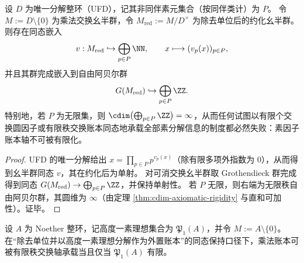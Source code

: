 \begin{theorem}\label{thm:prime-ledger-non-finitizable-ufd}
设 \(D\) 为唯一分解整环（UFD），记其非同伴素元集合（按同伴类计）为 \(P\)。
令 \(M:=D\setminus\{0\}\) 为乘法交换幺半群，令 \(M_{\mathrm{red}}:=M/D^\times\) 为除去单位后的约化幺半群。
则存在同态嵌入
\[
v:M_{\mathrm{red}}\hookrightarrow \bigoplus_{p\in P}\NN,\qquad x\longmapsto (v_p(x))_{p\in P},
\]
并且其群完成嵌入到自由阿贝尔群
\[
G(M_{\mathrm{red}})\hookrightarrow \bigoplus_{p\in P}\ZZ.
\]
特别地，若 \(P\) 为无限集，则 \(\cdim\bigl(\bigoplus_{p\in P}\ZZ\bigr)=\infty\)，从而任何试图以有限个交换圆因子或有限秩交换账本同态地承载全部素分解信息的制度都必然失败：素因子账本轴不可被有限化。
\end{theorem}
\begin{proof}
UFD 的唯一分解给出 \(x=\prod_{p\in P}p^{v_p(x)}\)（除有限多项外指数为 \(0\)），从而得到幺半群同态 \(v\)，其在约化后为单射。
对可消交换幺半群取 Grothendieck 群完成得到同态 \(G(M_{\mathrm{red}})\to \bigoplus_{p\in P}\ZZ\)，并保持单射性。
若 \(P\) 无限，则右端为无限秩自由阿贝尔群，其圆维为 \(\infty\)（由定理 \ref{thm:cdim-axiomatic-rigidity} 与直和可加性）。证毕。
\end{proof}

\begin{conjecture}[高度一素理想有限性与乘法账本的有限化]\label{conj:height-one-prime-ledger-finiteness}
设 \(A\) 为 Noether 整环，记高度一素理想集合为 \(\mathfrak P_1(A)\)，并令 \(M:=A\setminus\{0\}\)。
在“除去单位并以高度一素理想分解作为外置账本”的同态保持口径下，乘法账本可被有限秩交换轴承载当且仅当 \(\mathfrak P_1(A)\) 有限。
\end{conjecture}

\endinput
